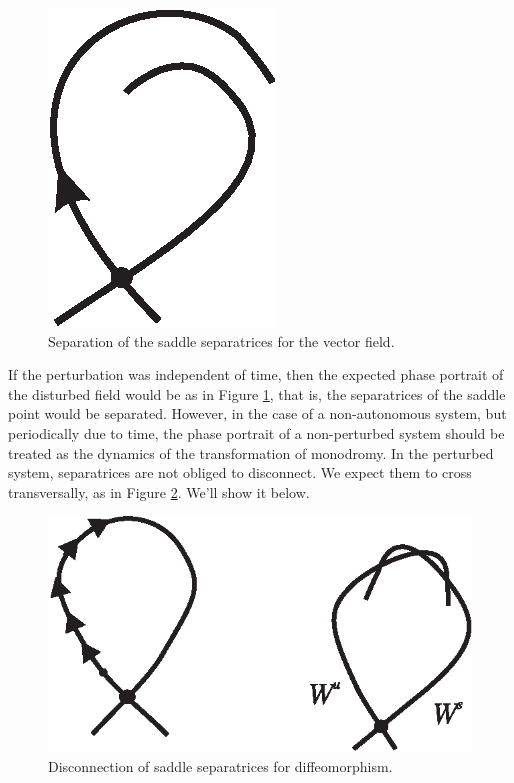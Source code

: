 \begin{example}
	\begin{figure}[!ht]
		\centering
		\includegraphics [scale=1.4]{jtr54}
		\caption{Separation of the saddle separatrices for the vector field.}
		\label{fig:5.4}
	\end{figure}
	
	If the perturbation was independent of time, then the expected phase portrait of the disturbed field would be as in Figure \ref{fig:5.4}, that is, the separatrices of the saddle point would be separated. However, in the case of a non-autonomous system, but periodically due to time, the phase portrait of a non-perturbed system should be treated as the dynamics of the transformation of monodromy. In the perturbed system, separatrices are not obliged to disconnect. We expect them to cross transversally, as in Figure \ref{fig:5.5}. We'll show it below.
	\begin{figure}[!ht]
		\centering
		\includegraphics [scale=1.4]{jtr55}
		\caption{Disconnection of saddle separatrices for diffeomorphism.}
		\label{fig:5.5}
	\end{figure}
	

\end{example}

